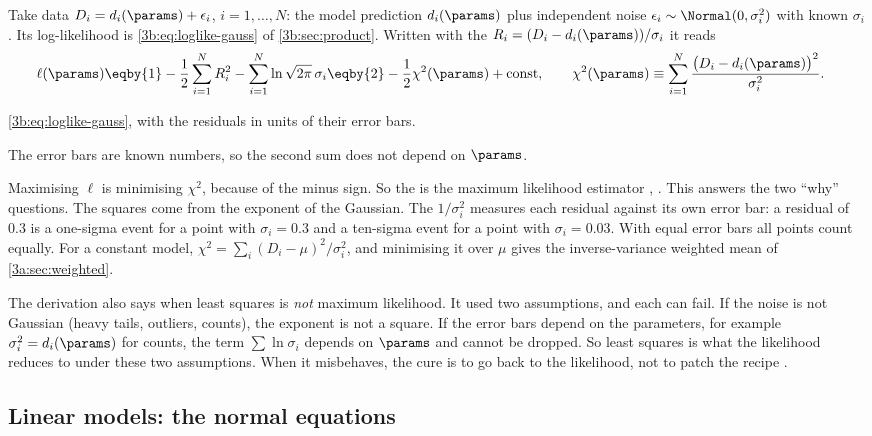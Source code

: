 Take data $D_i=d_i(\params)+\epsilon_i$, $i=1,\dots,N$: the model prediction
$d_i(\params)$ plus independent noise $\epsilon_i\sim\Normal(0,\sigma_i^2)$
with known $\sigma_i$. Its log-likelihood is \eqref{3b:eq:loglike-gauss} of
\cref{3b:sec:product}. Written with the
 $R_i=(D_i-d_i(\params))/\sigma_i$ it reads
\begin{align}
  \ell(\params)
  &\eqby{1}-\frac12\sum_{i=1}^NR_i^2-\sum_{i=1}^N\ln\sqrt{2\pi}\,\sigma_i
  \eqby{2}-\frac12\chi^2(\params)+\text{const},
  \qquad
  \chi^2(\params)\equiv\sum_{i=1}^N\frac{\bigl(D_i-d_i(\params)\bigr)^2}{\sigma_i^2}.
  \label{3b:eq:chi2-def}
\end{align}
\begin{explain}
  \item \eqref{3b:eq:loglike-gauss}, with the residuals in units of their
        error bars.
  \item The error bars are known numbers, so the second sum does not
        depend on $\params$.
\end{explain}
Maximising $\ell$ is minimising $\chi^2$, because of the minus sign. So the
 is the maximum likelihood estimator
, . This
answers the two ``why'' questions. The squares come from the exponent of the
Gaussian. The $1/\sigma_i^2$ measures each residual against its own error
bar: a residual of $0.3$ is a one-sigma event for a point with
$\sigma_i=0.3$ and a ten-sigma event for a point with $\sigma_i=0.03$. With
equal error bars all points count equally. For a constant model,
$\chi^2=\sum_i(D_i-\mu)^2/\sigma_i^2$, and minimising it over $\mu$ gives
the inverse-variance weighted mean of \cref{3a:sec:weighted}.

The derivation also says when least squares is \emph{not} maximum
likelihood. It used two assumptions, and each can fail. If the noise is not
Gaussian (heavy tails, outliers, counts), the exponent is not a square. If
the error bars depend on the parameters, for example $\sigma_i^2=d_i(\params)$
for counts, the term $\sum\ln\sigma_i$ depends on $\params$ and cannot be
dropped. So least squares is what the likelihood reduces to under these two
assumptions. When it misbehaves, the cure is to go back to the likelihood,
not to patch the recipe .

\subsection{Linear models: the normal equations}
\label{3b:sec:linear-ls}

